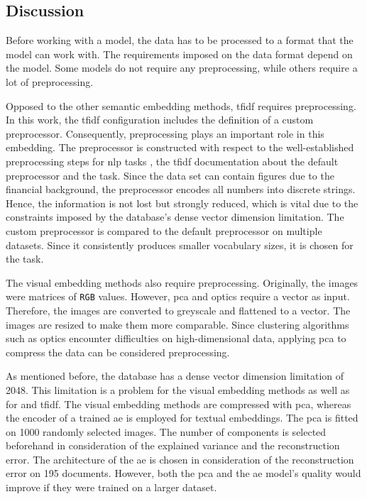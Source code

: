 \subsection{Discussion}\label{subsec:discussion}

Before working with a model, the data has to be processed to a format that the model can work with.
The requirements imposed on the data format depend on the model.
Some models do not require any preprocessing, while others require a lot of preprocessing.

Opposed to the other semantic embedding methods, \ac{tfidf} requires preprocessing.
In this work, the \ac{tfidf} configuration includes the definition of a custom preprocessor.
Consequently, preprocessing plays an important role in this embedding.
The preprocessor is constructed with respect to the well-established preprocessing steps for \ac{nlp} tasks \cite{nlp-book2009},
the \ac{tfidf} documentation about the default preprocessor and the task.
Since the data set can contain figures due to the financial background, the preprocessor encodes all numbers into discrete strings.
Hence, the information is not lost but strongly reduced, which is vital due to the constraints imposed 
by the database's dense vector dimension limitation.
The custom preprocessor is compared to the default preprocessor on multiple datasets.
Since it consistently produces smaller vocabulary sizes, it is chosen for the task.

The visual embedding methods also require preprocessing.
Originally, the images were matrices of \texttt{RGB} values.
However, \ac{pca} and \ac{optics} require a vector as input.
Therefore, the images are converted to greyscale and flattened to a vector.
The images are resized to make them more comparable.
Since clustering algorithms such as \ac{optics} encounter difficulties on high-dimensional data, 
applying \ac{pca} to compress the data can be considered preprocessing.


As mentioned before, the database has a dense vector dimension limitation of 2048.
This limitation is a problem for the visual embedding methods as well as for \infersent{} and 
\ac{tfidf}.
The visual embedding methods are compressed with \ac{pca}, 
whereas the encoder of a trained \ac{ae} is employed for textual embeddings.
The \ac{pca} is fitted on 1000 randomly selected images.
The number of components is selected beforehand in consideration of the explained variance and the reconstruction error.
The architecture of the \ac{ae} is chosen in consideration of the reconstruction error on 195 documents.
However, both the \ac{pca} and the \ac{ae} model's quality would improve if they were trained on a larger dataset.


